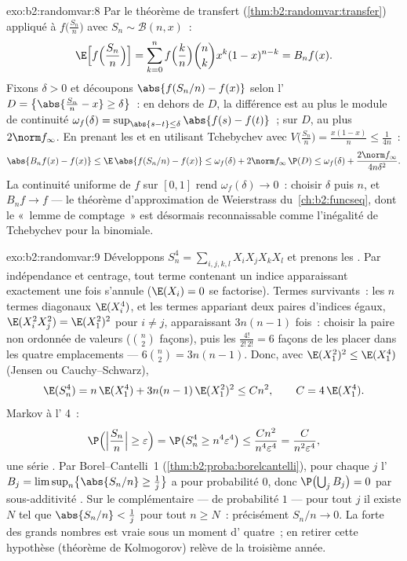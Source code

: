 \begin{solution}{exo:b2:randomvar:8}
Par le théorème de transfert (\cref{thm:b2:randomvar:transfer})
appliqué à $f\bigl(\frac{S_n}{n}\bigr)$ avec $S_n \sim
\mathcal{B}(n, x)$~:
\[
\E\Bigl[f\Bigl(\frac{S_n}{n}\Bigr)\Bigr]
= \sum_{k=0}^n f\Bigl(\frac kn\Bigr)\binom nk x^k(1-x)^{n-k}
= B_nf(x) .
\]
Fixons $\delta > 0$ et découpons $\abs{f(S_n/n) - f(x)}$ selon l' $D
= \bigl\{\abs{\frac{S_n}{n} - x} \geq \delta\bigr\}$~:
en dehors de $D$, la différence est au plus le module de continuité
$\omega_f(\delta) = \sup_{\abs{s - t}\leq\delta}\abs{f(s) -
f(t)}$~; sur $D$, au plus $2\norm f_\infty$. En prenant les  et
en utilisant Tchebychev avec $V\bigl(\frac{S_n}{n}\bigr) =
\frac{x(1-x)}{n} \leq \frac{1}{4n}$~:
\[
\abs{B_nf(x) - f(x)}
\leq \E\,\abs{f(S_n/n) - f(x)}
\leq \omega_f(\delta)
+ 2\norm f_\infty\,\P(D)
\leq \omega_f(\delta) + \frac{2\norm f_\infty}{4n\delta^2} .
\]
La continuité uniforme de $f$ sur $[0, 1]$ rend $\omega_f(\delta) \to
0$~: choisir $\delta$ puis $n$, et $B_nf \to f$  --- le
théorème d'approximation de Weierstrass du~\cref{ch:b2:funcseq}, dont le
«~lemme de comptage~» est désormais reconnaissable comme l'inégalité de Tchebychev
pour la  binomiale.
\end{solution}

\begin{solution}{exo:b2:randomvar:9}
Développons $S_n^4 = \sum_{i,j,k,l}X_iX_jX_kX_l$ et prenons les
. Par indépendance et centrage, tout terme contenant
un indice apparaissant exactement une fois s'annule ($\E(X_i) = 0$ se
factorise). Termes survivants~: les $n$ termes diagonaux $\E(X_i^4)$, et les
termes appariant deux paires d'indices égaux, $\E(X_i^2X_j^2) =
\E(X_1^2)^2$ pour $i \neq j$, apparaissant $3n(n-1)$ fois~: choisir
la paire non ordonnée de valeurs ($\binom n2$ façons), puis les
$\frac{4!}{2!\,2!} = 6$ façons de les placer dans les quatre emplacements ---
$6\binom n2 = 3n(n-1)$. Donc, avec $\E(X_1^2)^2
\leq \E(X_1^4)$ (Jensen ou Cauchy--Schwarz),
\[
\E(S_n^4) = n\,\E(X_1^4) + 3n(n-1)\,\E(X_1^2)^2
\leq C n^2,
\qquad C = 4\,\E(X_1^4) .
\]
Markov à l' 4~:
\[
\P\Bigl(\Bigl|\frac{S_n}{n}\Bigr| \geq \varepsilon\Bigr)
= \P\bigl(S_n^4 \geq n^4\varepsilon^4\bigr)
\leq \frac{Cn^2}{n^4\varepsilon^4}
= \frac{C}{n^2\varepsilon^4} ,
\]
une série . Par Borel--Cantelli~1
(\cref{thm:b2:proba:borelcantelli}), pour chaque $j$ l'
$B_j = \limsup_n\bigl\{\abs{S_n/n} \geq \frac1j\bigr\}$ a pour
probabilité $0$, donc $\P\bigl(\bigcup_j B_j\bigr) = 0$ par
sous-additivité . Sur le complémentaire --- de probabilité $1$
--- pour tout $j$ il existe $N$ tel que $\abs{S_n/n} < \frac1j$ pour
tout $n \geq N$~: précisément $S_n/n \to 0$. La  forte des grands
nombres est vraie sous un moment d' quatre~; en retirer cette hypothèse
(théorème de Kolmogorov) relève de la troisième année.
\end{solution}


